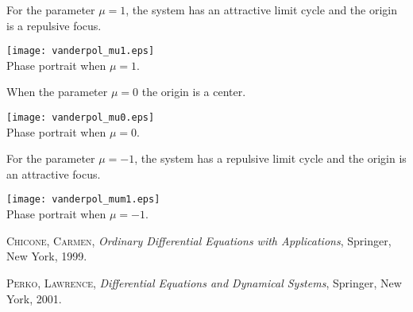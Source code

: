 \documentclass[12pt]{article}
\begin{document}
For the parameter $\mu=1$, the system has 
an attractive limit cycle and the origin is a repulsive focus.
\begin{center}
\texttt{[image: vanderpol\_mu1.eps]}\\
\small Phase portrait when $\mu=1$.
\end{center}
When the parameter $\mu=0$ the origin is a center.
\begin{center}
\texttt{[image: vanderpol\_mu0.eps]}\\
\small Phase portrait when $\mu=0$.
\end{center}
For the parameter
$\mu=-1$, the system has a repulsive limit cycle and the origin is
an attractive focus.
\begin{center}
\texttt{[image: vanderpol\_mum1.eps]}\\
\small Phase portrait when $\mu=-1$.
\end{center}

\begin{thebibliography}{1}
{\scshape Chicone, Carmen},
\emph{Ordinary Differential Equations with Applications},
Springer, New York, 1999.

{\scshape Perko, Lawrence},
\emph{Differential Equations and Dynamical Systems},
Springer, New York, 2001.
\end{thebibliography}
\end{document}
